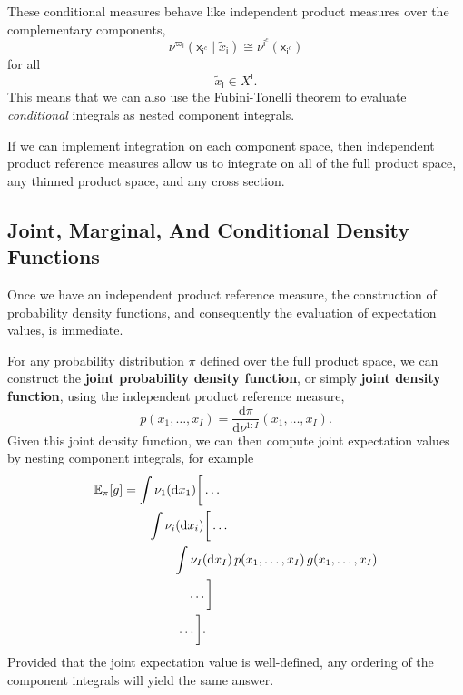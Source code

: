\documentclass[
  letterpaper,
  DIV=11,
  numbers=noendperiod]{scrartcl}
\begin{document}
These conditional measures behave like independent product measures over
the complementary components, \[
\nu^{\varpi_{\mathsf{i}}}(
  \mathsf{x}_{\mathsf{i}^{c}} \mid
  \tilde{x}_{ \mathsf{i} }
)
\cong
\nu^{ \mathsf{i}^{c} } (
  \mathsf{x}_{\mathsf{i}^{c}}
)
\] for all \[
\tilde{x}_{ \mathsf{i} } \in X^{ \mathsf{i} }.
\] This means that we can also use the Fubini-Tonelli theorem to
evaluate \emph{conditional} integrals as nested component integrals.

If we can implement integration on each component space, then
independent product reference measures allow us to integrate on all of
the full product space, any thinned product space, and any cross
section.

\subsection{Joint, Marginal, And Conditional Density
Functions}\label{joint-marginal-and-conditional-density-functions}

Once we have an independent product reference measure, the construction
of probability density functions, and consequently the evaluation of
expectation values, is immediate.

For any probability distribution \(\pi\) defined over the full product
space, we can construct the \textbf{joint probability density function},
or simply \textbf{joint density function}, using the independent product
reference measure, \[
p( x_{1}, \ldots, x_{I} )
=
\frac{
  \mathrm{d} \pi
}{
  \mathrm{d} \nu^{1:I}
} ( x_{1}, \ldots, x_{I} ).
\] Given this joint density function, we can then compute joint
expectation values by nesting component integrals, for example
\begin{align*}
\mathbb{E}_{ \pi }[ g ]
&=
\int \nu_{1}( \mathrm{d} x_{1} ) \bigg[ \ldots
\\
& \quad\quad \int \nu_{i}( \mathrm{d} x_{i} ) \bigg[ \ldots
\\
& \quad\quad\quad\quad
\int \nu_{I}( \mathrm{d} x_{I} ) \,
          p( x_{1}, \ldots, x_{I} ) \,
          g( x_{1}, \ldots, x_{I} )
\\
& \hspace{18mm} \ldots \bigg]
\\
& \hspace{15mm} \ldots \bigg].
\end{align*} Provided that the joint expectation value is well-defined,
any ordering of the component integrals will yield the same answer.
\end{document}
